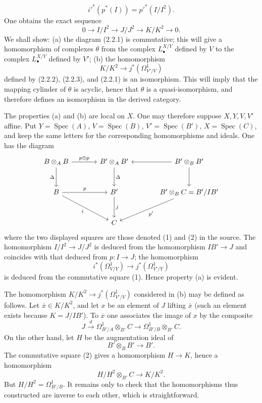 \documentclass[11pt]{article}
\newcommand{\Spec}{\operatorname{Spec}}
\begin{document}
\[
i'^*(p^*(I))=p'^*(I/I^2).
\]
One obtains the exact sequence
\begin{equation}\tag{2.2.3}
0\longrightarrow I/I^2\longrightarrow J/J^2\longrightarrow K/K^2\longrightarrow0.
\end{equation}
We shall show: (a) the diagram (2.2.1) is commutative; this will give a homomorphism of complexes $\theta$ from the complex $L^{X/Y}_\bullet$ defined by $V$ to the complex $L^{X/Y}_\bullet$ defined by $V'$; (b) the homomorphism
\[
K/K^2\longrightarrow j^*(\Omega^1_{V'/V})
\]
defined by (2.2.2), (2.2.3), and (2.2.1) is an isomorphism. This will imply that the mapping cylinder of $\theta$ is acyclic, hence that $\theta$ is a quasi-isomorphism, and therefore defines an isomorphism in the derived category.

The properties (a) and (b) are local on $X$. One may therefore suppose $X,Y,V,V'$ affine. Put $Y=\Spec(A)$, $V=\Spec(B)$, $V'=\Spec(B')$, $X=\Spec(C)$, and keep the same letters for the corresponding homomorphisms and ideals. One has the diagram
\[
\begin{tikzcd}[column sep=large,row sep=large]
B\otimes_A B \arrow[r,"p\otimes p"] \arrow[d,"\Delta"'] & B'\otimes_A B' \arrow[d,"\Delta"] & B'\otimes_B B' \arrow[l] \arrow[d]\\
B \arrow[r,"p"] \arrow[dr,"i"'] & B' \arrow[d,"j"] & B'\otimes_B C = B'/IB' \arrow[dl,"p'" ]\\
{} & C & {}
\end{tikzcd}
\]
where the two displayed squares are those denoted (1) and (2) in the source.
The homomorphism $I/I^2\to J/J^2$ is deduced from the homomorphism $IB'\to J$ and coincides with that deduced from $p:I\to J$; the homomorphism
\[
i^*(\Omega^1_{V/Y})\longrightarrow j^*(\Omega^1_{V'/Y})
\]
is deduced from the commutative square (1). Hence property (a) is evident.

The homomorphism $K/K^2\to j^*(\Omega^1_{V'/V})$ considered in (b) may be defined as follows. Let $\overline x\in K/K^2$, and let $x$ be an element of $J$ lifting $\overline x$ (such an element exists because $K=J/IB'$). To $\overline x$ one associates the image of $x$ by the composite
\[
J\xrightarrow{d}\Omega^1_{B'/A}\otimes_{B'}C
\longrightarrow\Omega^1_{B'/B}\otimes_{B'}C.
\]
On the other hand, let $H$ be the augmentation ideal of
\[
B'\otimes_B B'\longrightarrow B'.
\]
The commutative square (2) gives a homomorphism $H\to K$, hence a homomorphism
\[
H/H^2\otimes_{B'}C\longrightarrow K/K^2.
\]
But $H/H^2=\Omega^1_{B'/B}$. It remains only to check that the homomorphisms thus constructed are inverse to each other, which is straightforward.
\end{document}
